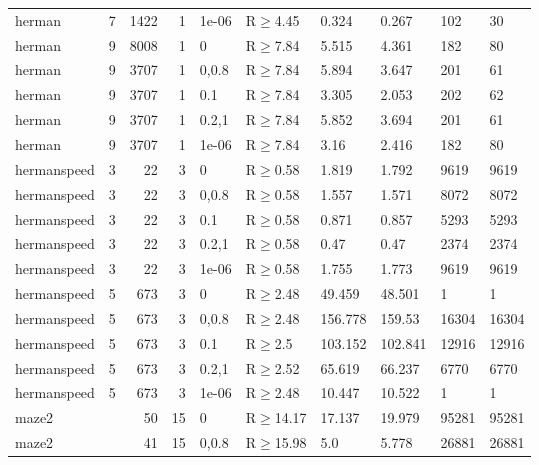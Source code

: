 \begin{longtable}{llrrllllll}
 herman        & 7         &   	1422 &    1 & 1e-06 & R$\geq$4.45  & 0.324   & 0.267    & 102    & 30     \\
 herman        & 9         &   	8008 &    1 & 0     & R$\geq$7.84  & 5.515   & 4.361    & 182    & 80     \\
 herman        & 9         &   	3707 &    1 & 0,0.8 & R$\geq$7.84  & 5.894   & 3.647    & 201    & 61     \\
 herman        & 9         &   	3707 &    1 & 0.1   & R$\geq$7.84  & 3.305   & 2.053    & 202    & 62     \\
 herman        & 9         &   	3707 &    1 & 0.2,1 & R$\geq$7.84  & 5.852   & 3.694    & 201    & 61     \\
 herman        & 9         &   	3707 &    1 & 1e-06 & R$\geq$7.84  & 3.16    & 2.416    & 182    & 80     \\
 hermanspeed   & 3         &     	22 &    3 & 0     & R$\geq$0.58  & 1.819   & 1.792    & 9619   & 9619   \\
 hermanspeed   & 3         &     	22 &    3 & 0,0.8 & R$\geq$0.58  & 1.557   & 1.571    & 8072   & 8072   \\
 hermanspeed   & 3         &     	22 &    3 & 0.1   & R$\geq$0.58  & 0.871   & 0.857    & 5293   & 5293   \\
 hermanspeed   & 3         &     	22 &    3 & 0.2,1 & R$\geq$0.58  & 0.47    & 0.47     & 2374   & 2374   \\
 hermanspeed   & 3         &     	22 &    3 & 1e-06 & R$\geq$0.58  & 1.755   & 1.773    & 9619   & 9619   \\
 hermanspeed   & 5         &    	673 &    3 & 0     & R$\geq$2.48  & 49.459  & 48.501   & 1      & 1      \\
 hermanspeed   & 5         &    	673 &    3 & 0,0.8 & R$\geq$2.48  & 156.778 & 159.53   & 16304  & 16304  \\
 hermanspeed   & 5         &    	673 &    3 & 0.1   & R$\geq$2.5   & 103.152 & 102.841  & 12916  & 12916  \\
 hermanspeed   & 5         &    	673 &    3 & 0.2,1 & R$\geq$2.52  & 65.619  & 66.237   & 6770   & 6770   \\
 hermanspeed   & 5         &    	673 &    3 & 1e-06 & R$\geq$2.48  & 10.447  & 10.522   & 1      & 1      \\
 maze2         &           &     	50 &   15 & 0     & R$\geq$14.17 & 17.137  & 19.979   & 95281  & 95281  \\
 maze2         &           &     	41 &   15 & 0,0.8 & R$\geq$15.98 & 5.0     & 5.778    & 26881  & 26881  \\

\end{longtable}

